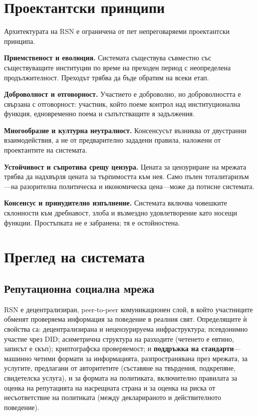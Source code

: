 \documentclass[11pt,a4paper,twocolumn]{article}
\begin{document}
\section{Проектантски принципи}

Архитектурата на RSN е ограничена от пет непреговаряеми проектантски принципа.

\textbf{Приемственост и еволюция.} Системата съществува съвместно със съществуващите институции по време на преходен период с неопределена продължителност. Преходът трябва да бъде обратим на всеки етап.

\textbf{Доброволност и отговорност.} Участието е доброволно, но доброволността е свързана с отговорност: участник, който поеме контрол над институционална функция, едновременно поема и съпътстващите я задължения.

\textbf{Многообразие и културна неутралност.} Консенсусът възниква от двустранни взаимодействия, а не от предварително зададени правила, наложени от проектантите на системата.

\textbf{Устойчивост и съпротива срещу цензура.} Цената за цензуриране на мрежата трябва да надхвърля цената за търпимостта към нея. Само пълен тоталитаризъм---на разорителна политическа и икономическа цена---може да потисне системата.

\textbf{Консенсус и принудително изпълнение.} Системата включва човешките склонности към дребнавост, злоба и възмездно удовлетворение като носещи функции. Простъпката не е забранена; тя е остойностена.

\section{Преглед на системата}

\subsection{Репутационна социална мрежа}

RSN е децентрализиран, peer-to-peer комуникационен слой, в който участниците обменят проверяема информация за поведение в реалния свят. Определящите ѝ свойства са: децентрализирана и нецензурируема инфраструктура; псевдонимно участие чрез DID; асиметрична структура на разходите (четенето е евтино, записът е скъп); криптографска проверяемост; и \textbf{поддръжка на стандарти}---машинно четими формати за информацията, разпространявана през мрежата, за услугите, предлагани от авторитетите (съставяне на твърдения, подкрепяне, свидетелска услуга), и за формата на политиката, включително правилата за оценка на репутацията на насрещната страна и за оценка на риска от несъответствие на политиката (между декларираното и действителното поведение).
\end{document}
